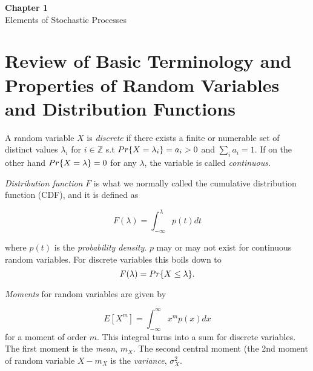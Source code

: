 
\begin{center}
{\LARGE \bf Chapter 1} \\
{\LARGE Elements of Stochastic Processes}\\
\end{center}

\section{Review of Basic Terminology and Properties of Random Variables and Distribution Functions}
\par A random variable $X$ is \textit{discrete} if there exists a finite or numerable set of distinct values
$\lambda_i$ for $i\in\mathbb{Z}$ s.t $Pr\{X=\lambda_i\}=a_i>0$ and $\sum_i a_i = 1$.
If on the other hand $Pr\{X=\lambda\}=0$ for any $\lambda$, the variable is called \textit{continuous}.

\par \textit{Distribution function} $F$ is what we normally called the cumulative distribution function (CDF),
 and it is defined as

\begin{equation}
    F(\lambda) = \int_{-\infty}^{\lambda}p(t)dt
\end{equation}

where $p(t)$ is the \textit{probability density}. $p$ may or may not exist for continuous random variables. For
discrete variables this boils down to
\begin{equation}
    F(\lambda) = Pr\{X\leq\lambda\}.
\end{equation}

\par \textit{Moments} for random variables are given by

\begin{equation}
    E[X^m] = \int_{-\infty}^{\infty}x^mp(x)dx
\end{equation}
for a moment of order $m$. This integral turns into a sum for discrete variables. The first moment is the \textit{mean},
$m_X$. The second central moment (the 2nd moment of random variable $X - m_X$ is the \textit{variance}, $\sigma_X^2$.

